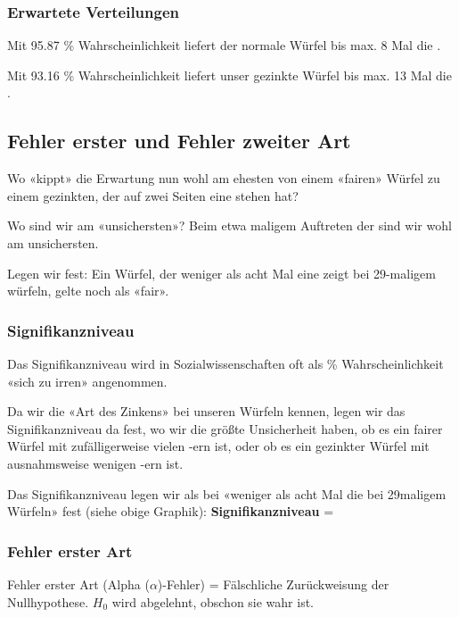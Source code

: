 \subsubsection*{Erwartete Verteilungen}
\newpage

Mit 95.87 \% Wahrscheinlichkeit liefert der normale Würfel bis max. 8 Mal die .

Mit 93.16 \% Wahrscheinlichkeit liefert unser gezinkte  Würfel bis
max. 13 Mal die . 

\newpage


\subsection{Fehler erster und Fehler zweiter Art}
Wo «kippt» die Erwartung nun wohl am ehesten von einem «fairen» Würfel
zu einem gezinkten, der auf zwei Seiten eine  stehen hat?

Wo sind wir am «unsichersten»?
Beim etwa  maligem Auftreten der  sind wir
wohl am unsichersten.

Legen wir fest: Ein Würfel, der weniger als acht Mal
eine  zeigt bei 29-maligem würfeln, gelte noch als «fair».

\subsubsection{Signifikanzniveau}
Das Signifikanzniveau wird in Sozialwissenschaften oft als  \%
Wahrscheinlichkeit «sich zu irren» angenommen.

Da wir die «Art des Zinkens» bei unseren Würfeln kennen, legen wir das
Signifikanzniveau da fest, wo wir die größte Unsicherheit haben, ob
es ein fairer Würfel mit zufälligerweise vielen -ern ist,
oder ob es ein gezinkter Würfel mit ausnahmsweise wenigen
-ern ist.

Das Signifikanzniveau legen wir als bei «weniger als acht Mal die
 bei 29maligem Würfeln» fest (siehe obige Graphik):
\vspace{15mm}
\textbf{Signifikanzniveau} = 


\subsubsection{Fehler erster Art}
Fehler erster Art (Alpha ($\alpha$)-Fehler) = Fälschliche
Zurückweisung der Nullhypothese. $H_0$ wird abgelehnt, obschon sie
wahr ist. 

